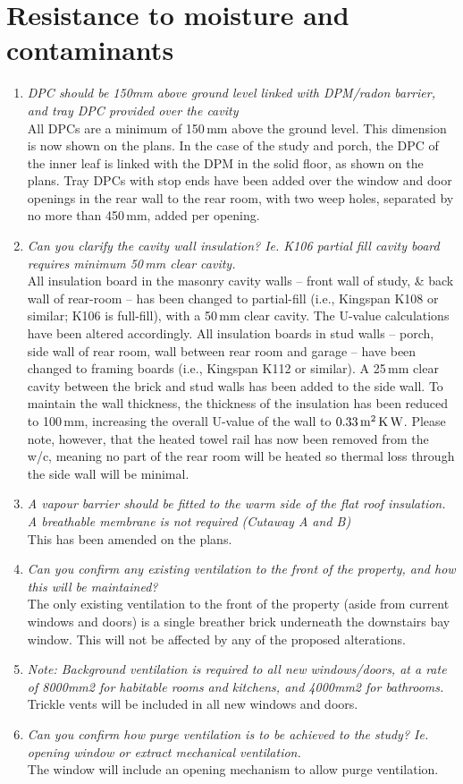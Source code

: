 \documentclass{extension}
\begin{document}
\section{Resistance to moisture and contaminants}
\begin{enumerate}
\item {\it DPC should be 150mm above ground level linked with DPM/radon barrier, and tray DPC provided over the cavity}\\
All DPCs are a minimum of 150\,mm above the ground level. This dimension is now shown on the plans. In the case of the study and porch, the DPC of the inner leaf is linked with the DPM in the solid floor, as shown on the plans. Tray DPCs with stop ends have been added over the window and door openings in the rear wall to the rear room, with two weep holes, separated by no more than 450\,mm, added per opening.
\item {\it Can you clarify the cavity wall insulation? Ie. K106 partial fill cavity board requires minimum 50\,mm clear cavity.}\\
All insulation board in the masonry cavity walls -- front wall of study, \& back wall of rear-room -- has been changed to partial-fill (i.e., Kingspan K108 or similar; K106 is full-fill), with a 50\,mm clear cavity. The U-value calculations have been altered accordingly. All insulation boards in stud walls -- porch, side wall of rear room, wall between rear room and garage -- have been changed to framing boards (i.e., Kingspan K112 or similar). A 25\,mm clear cavity between the brick and stud walls has been added to the side wall. To maintain the wall thickness, the thickness of the insulation has been reduced to 100\,mm, increasing the overall U-value of the wall to $0.33\,{\rm m^2\,K\,W}$. Please note, however, that the heated towel rail has now been removed from the w/c, meaning no part of the rear room will be heated so thermal loss through the side wall will be minimal.
\item {\it A vapour barrier should be fitted to the warm side of the flat roof insulation. A breathable membrane is not required (Cutaway A and B)}\\
This has been amended on the plans.
\item {\it Can you confirm any existing ventilation to the front of the property, and how this will be maintained?}\\
The only existing ventilation to the front of the property (aside from current windows and doors) is a single breather brick underneath the downstairs bay window. This will not be affected by any of the proposed alterations.
\item {\it Note: Background ventilation is required to all new windows/doors, at a rate of 8000mm2 for habitable rooms and kitchens, and 4000mm2 for bathrooms.}\\
Trickle vents will be included in all new windows and doors.
\item {\it Can you confirm how purge ventilation is to be achieved to the study? Ie. opening window or extract mechanical ventilation.}\\
The window will include an opening mechanism to allow purge ventilation. 
\end{enumerate}
\end{document}

